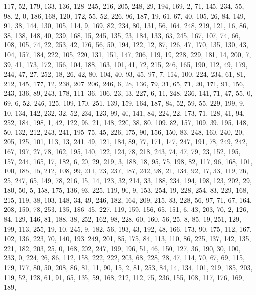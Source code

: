 \begin{DoxyCode}
       117, 52, 179, 133, 136, 128, 245, 216, 205, 248, 29, 194, 169, 2, 71, 145, 234, 55, 98, 2, 0, 186, 168, 120,
       172, 55, 52, 226, 96, 187, 19, 61, 67, 40, 105, 26, 84, 149, 91, 38, 144, 130, 105, 114, 9, 169, 82, 234, 80,
       131, 56, 164, 248, 219, 121, 16, 86, 38, 138, 148, 40, 239, 168, 15, 245, 135, 23, 184, 133, 63, 245, 167,
       107, 74, 66, 108, 105, 74, 22, 253, 42, 176, 56, 50, 194, 122, 12, 87, 126, 47, 170, 135, 130, 43, 104, 157,
       184, 222, 105, 220, 131, 151, 147, 206, 119, 19, 228, 229, 181, 14, 200, 7, 39, 41, 173, 172, 156, 104, 188,
       163, 101, 41, 72, 215, 246, 165, 190, 112, 49, 179, 244, 47, 27, 252, 18, 26, 42, 80, 104, 40, 93, 45, 97,
       7, 164, 100, 224, 234, 61, 81, 212, 145, 177, 12, 238, 207, 206, 246, 6, 28, 136, 79, 31, 65, 71, 20, 171,
       91, 156, 243, 136, 89, 243, 178, 111, 36, 106, 23, 13, 227, 6, 11, 248, 236, 141, 71, 47, 55, 0, 69, 6, 52,
       246, 125, 109, 170, 251, 139, 159, 164, 187, 84, 52, 59, 55, 229, 199, 9, 10, 134, 142, 232, 32, 52, 234,
       123, 99, 40, 141, 84, 224, 22, 173, 71, 128, 41, 94, 252, 184, 198, 1, 42, 122, 96, 21, 148, 220, 38, 80, 109,
       82, 157, 109, 39, 195, 148, 50, 132, 212, 243, 241, 195, 75, 45, 226, 175, 90, 156, 150, 83, 248, 160, 240,
       20, 205, 125, 101, 113, 13, 241, 49, 121, 184, 89, 77, 171, 147, 247, 191, 78, 249, 242, 167, 197, 27, 78,
       162, 195, 140, 122, 124, 78, 218, 243, 74, 47, 79, 23, 152, 195, 157, 244, 165, 17, 182, 6, 20, 29, 219, 3,
       188, 18, 95, 75, 198, 82, 117, 96, 168, 101, 100, 185, 15, 212, 108, 99, 211, 23, 237, 187, 242, 98, 21, 134,
       92, 17, 33, 119, 26, 25, 247, 65, 149, 78, 216, 15, 14, 123, 32, 214, 33, 188, 234, 194, 198, 123, 202, 29,
       180, 50, 5, 158, 175, 136, 93, 225, 119, 90, 9, 153, 254, 19, 228, 254, 83, 229, 168, 215, 119, 38, 103,
       148, 34, 49, 246, 182, 164, 209, 215, 83, 228, 56, 97, 71, 67, 164, 208, 150, 78, 253, 135, 186, 45, 227, 119,
       159, 156, 65, 151, 6, 43, 203, 70, 2, 126, 84, 129, 146, 81, 188, 38, 252, 162, 98, 228, 60, 160, 56, 25,
       8, 85, 19, 251, 129, 199, 113, 255, 19, 10, 245, 9, 182, 56, 193, 43, 192, 48, 166, 173, 90, 175, 112, 167,
       102, 136, 223, 70, 140, 193, 249, 201, 85, 175, 84, 113, 110, 86, 225, 137, 142, 135, 221, 182, 203, 25, 0,
       168, 202, 247, 199, 196, 51, 46, 150, 127, 36, 190, 30, 100, 233, 0, 224, 26, 86, 112, 158, 222, 222, 203,
       68, 228, 28, 47, 114, 70, 67, 69, 115, 179, 177, 80, 50, 208, 86, 81, 11, 90, 15, 2, 81, 253, 84, 14, 134,
       101, 219, 185, 203, 119, 52, 128, 61, 91, 65, 135, 59, 168, 212, 112, 75, 236, 155, 108, 117, 176, 169, 189,

\end{DoxyCode}
